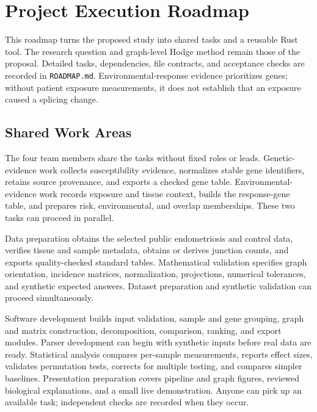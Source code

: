 \section{Project Execution Roadmap}

This roadmap turns the proposed study into shared tasks and a reusable
Rust tool. The research question and graph-level Hodge method remain those
of the proposal. Detailed tasks, dependencies, file contracts, and acceptance
checks are recorded in \texttt{ROADMAP.md}. Environmental-response evidence
prioritizes genes; without patient exposure measurements, it does not establish
that an exposure caused a splicing change.

\subsection{Shared Work Areas}

The four team members share the tasks without fixed roles or leads.
Genetic-evidence work collects susceptibility evidence, normalizes stable gene
identifiers, retains source provenance, and exports a checked gene table.
Environmental-evidence work records exposure and tissue context, builds the
response-gene table, and prepares risk, environmental, and overlap memberships.
These two tasks can proceed in parallel.

Data preparation obtains the selected public endometriosis and control data,
verifies tissue and sample metadata, obtains or derives junction counts, and exports
quality-checked standard tables. Mathematical validation specifies graph
orientation, incidence matrices, normalization, projections, numerical tolerances,
and synthetic expected answers. Dataset preparation and synthetic validation can
proceed simultaneously.

Software development builds input validation, sample and gene grouping, graph and
matrix construction, decomposition, comparison, ranking, and export modules.
Parser development can begin with synthetic inputs before real data are ready.
Statistical analysis compares per-sample measurements, reports effect sizes,
validates permutation tests, corrects for multiple testing, and compares simpler
baselines. Presentation preparation covers pipeline and graph figures,
reviewed biological explanations, and a small live demonstration. Anyone can
pick up an available task; independent checks are recorded when they occur.

